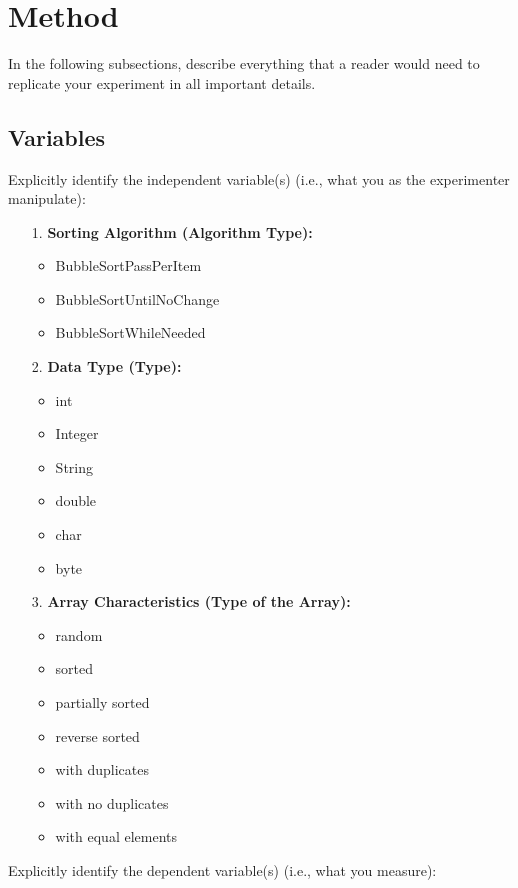 \documentclass{article}
\begin{document}
\section{Method}
In the following subsections, describe everything that a reader would need to replicate your experiment in all important details.
\subsection{Variables}
Explicitly identify the independent variable(s) (i.e., what you as the experimenter manipulate): 

    \begin{tcolorbox}[title=Independent Variable:, colback=white, colframe=black, arc=0pt, outer arc=0pt]
        \begin{itemize}
         \item[1.] \textbf{Sorting Algorithm (Algorithm Type):}
            \begin{itemize}
            \item BubbleSortPassPerItem
            \item BubbleSortUntilNoChange
            \item BubbleSortWhileNeeded
            \end{itemize}
        \item[2.] \textbf{Data Type (Type):}
            \begin{itemize}
            \item int
            \item Integer
            \item String
            \item double
            \item char
            \item byte
            \end{itemize}
        \item[3.] \textbf{Array Characteristics (Type of the Array):}
            \begin{itemize}
            \item random
            \item sorted
            \item partially sorted
            \item reverse sorted
            \item with duplicates
            \item with no duplicates
            \item with equal elements
            \end{itemize}
        \end{itemize}

    \end{tcolorbox}
Explicitly identify the dependent variable(s) (i.e., what you measure):\\
\end{document}
